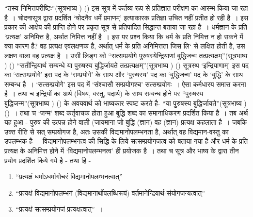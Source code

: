 “तस्य निमित्तपरीष्टिः”(सूत्रभाष्य ) () इस सूत्र में कर्तव्य रूप से प्रतिज्ञात परीक्षण का आरम्भ किया जा रहा है~। चोदनासूत्र द्वारा प्रदर्शित ‘चोदनैव धर्मे प्रमाणम्' इत्याकारक प्रतिज्ञा उचित नहीं प्रतीत हो रही है~। इस प्रकार की आक्षेप की प्राप्ति होने पर प्रकृत सूत्र से प्रतिपादित सिद्धान्त बताया जा रहा है~। धर्मज्ञान के प्रति ‘प्रत्यक्ष' अनिमित्त है, अर्थात निमित्त नहीं है~। इस पर प्रश्न किया कि धर्म के प्रति निमित्त न हो सकने में क्या कारण है? वह प्रत्यक्ष एवंलक्षणक है, अर्थात् धर्म के प्रति अनिमित्तता जिस लि‘ से लक्षित होती है, उस लक्षण वाला वह प्रत्यक्ष है~। उसी लिङ्ग को “सत्सम्प्रयोगे पुरुषस्येन्द्रियाणां बुद्धिजन्म तत्प्रत्यक्षम्”(सूत्रभाष्य ) () “सतीन्द्रियार्थ सम्बन्धे या पुरुषस्य बुद्धिर्जायते तत्प्रत्यक्षम्”(सूत्रभाष्य ) () सूत्रस्थ ‘इन्द्रियाणाम्' इस पद का ‘सत्सम्प्रयोगे' इस पद के ‘सम्प्रयोगे' के साथ और ‘पुरुषस्य' पद का ‘बुद्धिजन्म' पद के ‘बुद्धि' के साथ सम्बन्ध है~। ‘सत्सम्प्रयोगे' इस पद में ‘संश्चासौ सम्प्रयोगश्च' सत्सम्प्रयोगः~। ऐसा कर्मधारय समास करना है~। तथा च इन्द्रियों का अर्थ (विषय, वस्तु, पदार्थ) के साथ सम्बन्ध होने पर “पुरुषस्य बुद्धिजन्म”(सूत्रभाष्य ) () के अवयवार्थ को भाष्यकार स्पष्ट करते है- “या पुुरुषस्य बुद्धिर्जायते”(सूत्रभाष्य ) ()~। तथा च ‘जन्म' शब्द कर्तृवाचक होता हुआ बुद्धि शब्द का समानाधिकरण प्रदर्शित किया है~। तब अर्थ यह हुआ - पुरुष की उत्पन्न होने वाली (जायमाना जो बुद्धि (ज्ञान) वह (ज्ञान) प्रत्यक्ष कहलाता है~। जबकि उक्त रीति से सत् सम्प्रयोगज है, अतः उसकी विद्यमानोपलम्भनता है, अर्थात् वह विद्यमान-वस्तु का उपलम्भक है~। विद्यमानोपलम्भनत्व की सिद्धि के लिये सत्सम्प्रयोगजत्व को बताया गया है और धर्म के प्रति प्रत्यक्ष के अनिमित्त होने में ‘विद्यमानोपलम्भनत्व' ही प्रयोजक है~। तथा च सूत्र और भाष्य के द्वारा तीन प्रयोग प्रदर्शित किये गये है - तथा हि -
\begin{enumerate}
\itemsep=0pt
\item “प्रत्यक्षं धर्माऽधर्मागोचरं विद्यमानोपलम्भनत्वात्”

 \item “प्रत्यक्षं विद्यमानोपलम्भनं (विद्यमानार्थोपलब्धिरूपं) वर्तमानेन्द्रियार्थ-संयोगजन्यत्वात्”

 \item “प्रत्यक्षं सत्सम्प्रयोगजं प्रत्यक्षत्वात्”~।

\end{enumerate}

